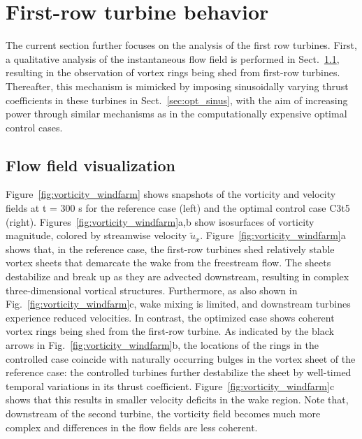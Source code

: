 \documentclass[wes, manuscript]{copernicus}
\begin{document}
\section{First-row turbine behavior}\label{sec:analysis_flow_vis}

The current section further focuses on the analysis of the first row turbines. First, a qualitative analysis of the instantaneous flow field is performed in Sect.~\ref{sec:opt_visualization}, resulting in the observation of vortex rings being shed from first-row turbines. Thereafter, this mechanism is mimicked by imposing sinusoidally varying thrust coefficients in these turbines in Sect.~\ref{sec:opt_sinus}, with the aim of increasing power through similar mechanisms as in the computationally expensive optimal control cases.

\subsection{Flow field visualization}\label{sec:opt_visualization}
Figure~\ref{fig:vorticity_windfarm} shows snapshots of the vorticity and velocity fields at t = 300 s for the reference case (left) and the optimal control case C3t5 (right). Figures~\ref{fig:vorticity_windfarm}a,b show isosurfaces of vorticity magnitude, colored by streamwise velocity $\widetilde{u}_x$. Figure~\ref{fig:vorticity_windfarm}a shows that, in the reference case, the first-row turbines shed relatively stable vortex sheets that demarcate the wake from the freestream flow. The sheets destabilize and break up as they are advected downstream, resulting in complex three-dimensional vortical structures. Furthermore, as also shown in Fig.~\ref{fig:vorticity_windfarm}c, wake mixing is limited, and downstream turbines experience reduced velocities. In contrast, the optimized case shows coherent vortex rings being shed from the first-row turbine. As indicated by the black arrows in Fig.~\ref{fig:vorticity_windfarm}b, the locations of the rings in the controlled case coincide with naturally occurring bulges in the vortex sheet of the reference case: the controlled turbines further destabilize the sheet by well-timed temporal variations in its thrust coefficient. Figure~\ref{fig:vorticity_windfarm}c shows that this results in smaller velocity deficits in the wake region. Note that, downstream of the second turbine, the vorticity field becomes much more complex and differences in the flow fields are less coherent. 
\end{document}
